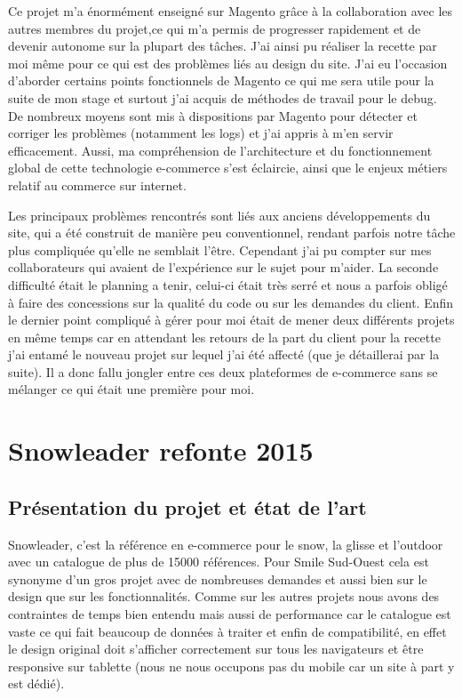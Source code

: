\documentclass[a4paper,11pt,twoside]{report}
\begin{document}
    Ce projet m'a énormément enseigné sur Magento grâce à la collaboration avec les autres membres du projet,ce qui m'a permis de progresser rapidement et de devenir autonome sur la plupart des tâches. J'ai ainsi pu réaliser la recette par moi même pour ce qui est des problèmes liés au design du site. J'ai eu l'occasion d'aborder certains points fonctionnels de Magento ce qui me sera utile pour la suite de mon stage et surtout j'ai acquis de méthodes de travail pour le debug. De nombreux moyens sont mis à dispositions par Magento pour détecter et corriger les problèmes (notamment les logs) et j'ai appris à m'en servir efficacement. Aussi, ma compréhension de l'architecture et du fonctionnement global de cette technologie e-commerce s'est éclaircie, ainsi que le enjeux métiers relatif au commerce sur internet.
    
    Les principaux problèmes rencontrés sont liés aux anciens développements du site, qui a été construit de manière peu conventionnel, rendant parfois notre tâche plus compliquée qu'elle ne semblait l'être. Cependant j'ai pu compter sur mes collaborateurs qui avaient de l'expérience sur le sujet pour m'aider. La seconde difficulté était le planning a tenir, celui-ci était très serré et nous a parfois obligé à faire des concessions sur la qualité du code ou sur les demandes du client. Enfin le dernier point compliqué à gérer pour moi était de mener deux différents projets en même temps car en attendant les retours de la part du client pour la recette j'ai entamé le nouveau projet sur lequel j'ai été affecté (que je détaillerai par la suite). Il a donc fallu jongler entre ces deux plateformes de e-commerce sans se mélanger ce qui était une première pour moi.   
    
        \newpage
    
  \section{Snowleader refonte 2015}
    \subsection*{Présentation du projet et état de l'art}
    Snowleader, c'est la référence en e-commerce pour le snow, la glisse et l'outdoor avec un catalogue de plus de 15000 références. Pour Smile Sud-Ouest cela est synonyme d'un gros projet avec de nombreuses demandes et aussi bien sur le design que sur les fonctionnalités. Comme sur les autres projets nous avons des contraintes de temps bien entendu mais aussi de performance car le catalogue est vaste ce qui fait beaucoup de données à traiter et enfin de compatibilité, en effet le design original doit s'afficher correctement sur tous les navigateurs et être responsive sur tablette (nous ne nous occupons pas du mobile car un site à part y est dédié). 
    
\end{document}
